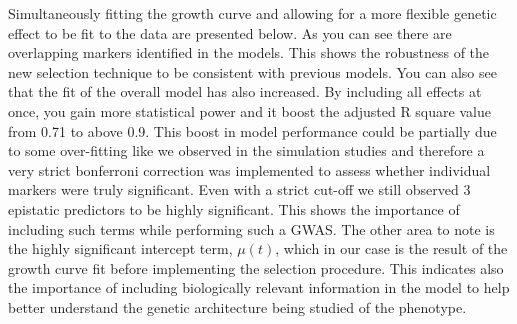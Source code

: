 \documentclass[11pt,]{book}
\theoremstyle{definition}
\theoremstyle{definition}
\theoremstyle{remark}
\begin{document}
Simultaneously fitting the growth curve and allowing for a more flexible
genetic effect to be fit to the data are presented below. As you can see
there are overlapping markers identified in the models. This shows the
robustness of the new selection technique to be consistent with previous
models. You can also see that the fit of the overall model has also
increased. By including all effects at once, you gain more statistical
power and it boost the adjusted R square value from 0.71 to above 0.9.
This boost in model performance could be partially due to some
over-fitting like we observed in the simulation studies and therefore a
very strict bonferroni correction was implemented to assess whether
individual markers were truly significant. Even with a strict cut-off we
still observed 3 epistatic predictors to be highly significant. This
shows the importance of including such terms while performing such a
GWAS. The other area to note is the highly significant intercept term,
\(\mu(t)\), which in our case is the result of the growth curve fit
before implementing the selection procedure. This indicates also the
importance of including biologically relevant information in the model
to help better understand the genetic architecture being studied of the
phenotype.
\end{document}
